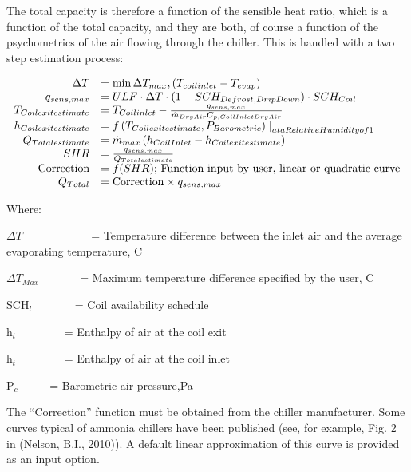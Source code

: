 The total capacity is therefore a function of the sensible heat ratio, which is a function of the total capacity, and they are both, of course a function of the psychometrics of the air flowing through the chiller. This is handled with a two step estimation process:

\begin{equation}
  \begin{array}{rl}
                  \Delta T &= \min{ \Delta T_{max},\PB{T_{coil inlet} - T_{evap}}} \\
              q_{sens,max} &= ULF \cdot \Delta T \cdot \PB{1 - SCH_{Defrost,DripDown}} \cdot SCH_{Coil} \\ 
    T_{Coil exit estimate} &= T_{Coil inlet} - \frac{q_{sens,max}}{\dot{m}_{DryAir} C_{p,Coil Inlet Dry Air}} \\
    h_{Coil exit estimate} &= f\PB{T_{Coil exit estimate},P_{Barometric}}\left.\right|_{at a Relative Humidity of 1} \\
        Q_{Total estimate} &= \dot{m}_{max}\PB{h_{Coil Inlet} - h_{Coil exit estimate}} \\
                       SHR &= \frac{q_{sens,max}}{Q_{Total estimate}} \\
         \text{Correction} &= f(SHR);\,\text{Function input by user, linear or quadratic curve} \\
                 Q_{Total} &= \text{Correction} \times q_{sens,max}
  \end{array}
\end{equation}

Where:

\(\Delta T\) ~~~~~~~~~~~ = Temperature difference between the inlet air and the average evaporating temperature, C

\(\Delta T{}_{Max}\) ~~~~~~ = Maximum temperature difference specified by the user, C

SCH\(_{l}\)~~~~~~~ = Coil availability schedule

h\(_{t}\)~~~~~~~~ = Enthalpy of air at the coil exit

h\(_{t}\)~~~~~~~~ = Enthalpy of air at the coil inlet

P\(_{c}\)~~~~~ = Barometric air pressure,Pa

The ``Correction'' function must be obtained from the chiller manufacturer. Some curves typical of ammonia chillers have been published (see, for example, Fig. 2 in (Nelson, B.I., 2010)). A default linear approximation of this curve is provided as an input option.

